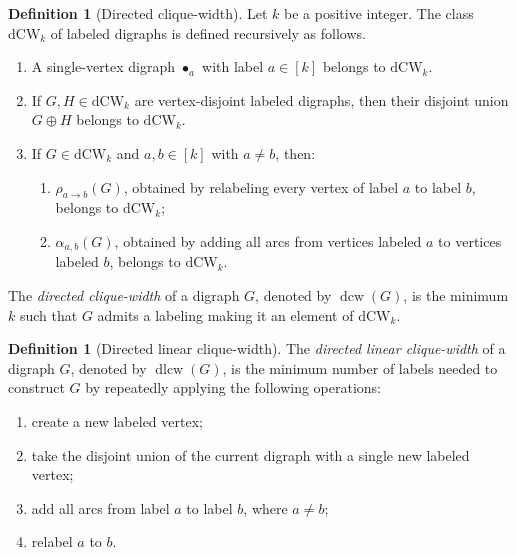 \documentclass[10pt]{book}
\theoremstyle{definition}
\newtheorem{definition}[theorem]{Definition}
\begin{document}
\begin{definition}[Directed clique-width]
\label{def:dcw}
\cite{65}
Let \(k\) be a positive integer. The class \(\mathrm{dCW}_k\) of labeled digraphs is defined recursively as follows.
\begin{enumerate}
    \item A single-vertex digraph \(\bullet_a\) with label \(a\in [k]\) belongs to \(\mathrm{dCW}_k\).

    \item If \(G,H\in \mathrm{dCW}_k\) are vertex-disjoint labeled digraphs, then their disjoint union \(G\oplus H\) belongs to \(\mathrm{dCW}_k\).

    \item If \(G\in \mathrm{dCW}_k\) and \(a,b\in [k]\) with \(a\neq b\), then:
    \begin{enumerate}
        \item \(\rho_{a\to b}(G)\), obtained by relabeling every vertex of label \(a\) to label \(b\), belongs to \(\mathrm{dCW}_k\);
        \item \(\alpha_{a,b}(G)\), obtained by adding all arcs from vertices labeled \(a\) to vertices labeled \(b\), belongs to \(\mathrm{dCW}_k\).
    \end{enumerate}
\end{enumerate}

The \emph{directed clique-width} of a digraph \(G\), denoted by \(\operatorname{dcw}(G)\), is the minimum \(k\) such that \(G\) admits a labeling making it an element of \(\mathrm{dCW}_k\).
\end{definition}

\begin{definition}[Directed linear clique-width]
\cite{65}
The \emph{directed linear clique-width} of a digraph \(G\), denoted by \(\operatorname{dlcw}(G)\), is the minimum number of labels needed to construct \(G\) by repeatedly applying the following operations:
\begin{enumerate}
    \item create a new labeled vertex;
    \item take the disjoint union of the current digraph with a single new labeled vertex;
    \item add all arcs from label \(a\) to label \(b\), where \(a\neq b\);
    \item relabel \(a\) to \(b\).
\end{enumerate}
\end{definition}
\end{document}
